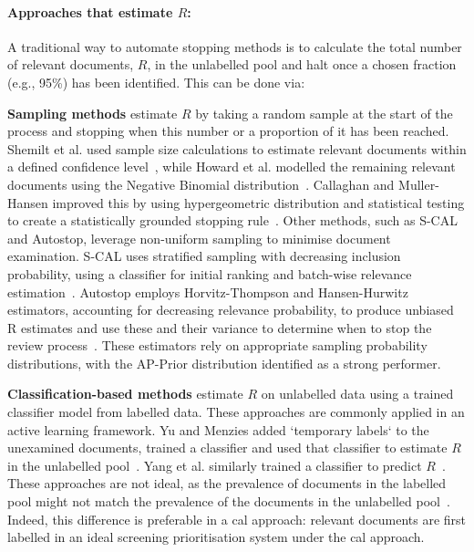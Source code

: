 \documentclass[10pt,oneside]{book}
\begin{document}
\paragraph{Approaches that estimate $R$:}
A traditional way to automate stopping methods is to calculate the total number of relevant documents, $R$, in the unlabelled pool and halt once a chosen fraction (e.g., 95\%) has been identified. This can be done via:

\textbf{Sampling methods} estimate $R$ by taking a random sample at the start of the process and stopping when this number or a proportion of it has been reached. Shemilt et al. used sample size calculations to estimate relevant documents within a defined confidence level~\cite{shemilt_pinpointing_2014}, while Howard et al. modelled the remaining relevant documents using the Negative Binomial distribution~\cite{howard_swift-active_2020}. Callaghan and Muller-Hansen improved this by using hypergeometric distribution and statistical testing to create a statistically grounded stopping rule~\cite{callaghan_statistical_2020}. Other methods, such as S-CAL and Autostop, leverage non-uniform sampling to minimise document examination. S-CAL uses stratified sampling with decreasing inclusion probability, using a classifier for initial ranking and batch-wise relevance estimation~\cite{cormack_scalability_2016}. Autostop employs Horvitz-Thompson and Hansen-Hurwitz estimators, accounting for decreasing relevance probability, to produce unbiased R estimates and use these and their variance to determine when to stop the review process~\cite{li_when_2020}. These estimators rely on appropriate sampling probability distributions, with the AP-Prior distribution identified as a strong performer.

\textbf{Classification-based methods} estimate $R$ on unlabelled data using a trained classifier model from labelled data. These approaches are commonly applied in an active learning framework. Yu and Menzies added `temporary labels` to the unexamined documents, trained a classifier and used that classifier to estimate $R$ in the unlabelled pool~\cite{yu_fast2_2019}. Yang et al. similarly trained a classifier to predict $R$~\cite{yang_heuristic_2021}. These approaches are not ideal, as the prevalence of documents in the labelled pool might not match the prevalence of the documents in the unlabelled pool~\cite{del_coz_learning_2021}. Indeed, this difference is preferable in a \gls*{cal} approach: relevant documents are first labelled in an ideal screening prioritisation system under the \gls*{cal} approach. 
\end{document}
